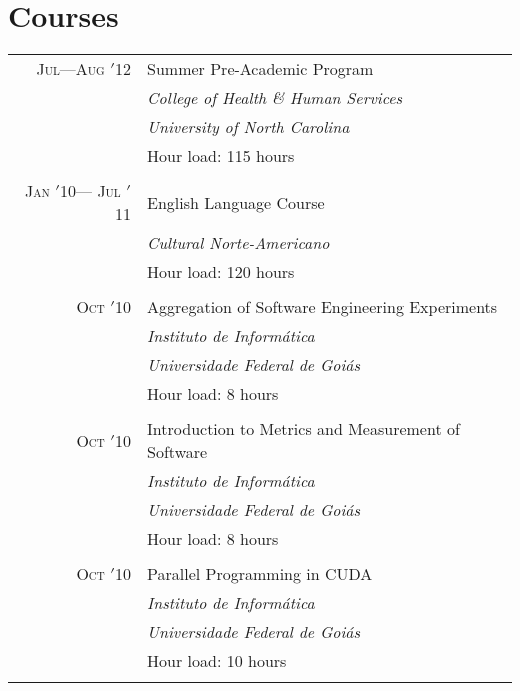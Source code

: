 \documentclass[a4paper,10pt]{article}
\begin{document}
\section{Courses}
\begin{tabular}{r|p{11cm}}

  \textsc{Jul---Aug $'$12} & Summer Pre-Academic Program\\ &
  \emph{College of Health \& Human Services}\\ &
  \emph{University of North Carolina}\\ &
  Hour load: 115 hours
  \\\multicolumn{2}{c}{} \\

  \textsc{Jan $'$10--- Jul $'$11} & English Language Course\\ &
  \emph{Cultural Norte-Americano} \\ &
  Hour load: 120 hours
  \\\multicolumn{2}{c}{} \\

  \textsc{Oct $'$10} & Aggregation of Software Engineering Experiments\\ &
  \emph{Instituto de Informática} \\ &
  \emph{Universidade Federal de Goiás}\\ &
  Hour load: 8 hours
  \\\multicolumn{2}{c}{} \\

  \textsc{Oct $'$10} & Introduction to Metrics and Measurement of Software\\ &
  \emph{Instituto de Informática} \\ &
  \emph{Universidade Federal de Goiás}\\ &
  Hour load: 8 hours
  \\\multicolumn{2}{c}{} \\

  \textsc{Oct $'$10} & Parallel Programming in CUDA\\ &
  \emph{Instituto de Informática} \\ &
  \emph{Universidade Federal de Goiás}\\ &
  Hour load: 10 hours
  \\\multicolumn{2}{c}{} \\

\end{tabular}

\pagebreak
\end{document}
